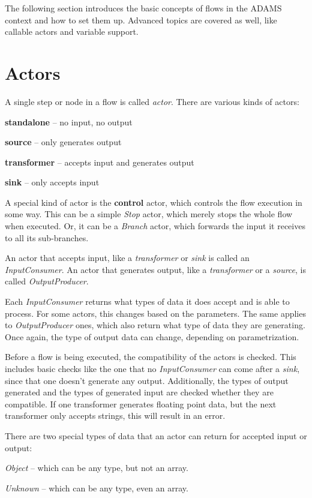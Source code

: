 The following section introduces the basic concepts of flows in the ADAMS
context and how to set them up. Advanced topics are covered as well, like
callable actors and variable support.

\section{Actors}
A single step or node in a flow is called \textit{actor}. There are various
kinds of actors:
\begin{tight_itemize}
  \item \textbf{standalone} -- no input, no output
  \item \textbf{source} -- only generates output
  \item \textbf{transformer} -- accepts input and generates output
  \item \textbf{sink} -- only accepts input
\end{tight_itemize}
A special kind of actor is the \textbf{control} actor, which controls the flow
execution in some way. This can be a simple \textit{Stop} actor, which merely
stops the whole flow when executed. Or, it can be a \textit{Branch} actor, which
forwards the input it receives to all its sub-branches.

An actor that accepts input, like a \textit{transformer} or \textit{sink} is
called an \textit{InputConsumer}. An actor that generates output, like
a \textit{transformer} or a \textit{source}, is called \textit{OutputProducer}.

Each \textit{InputConsumer} returns what types of data it does accept and is
able to process. For some actors, this changes based on the parameters. The same
applies to \textit{OutputProducer} ones, which also return what type of data
they are generating. Once again, the type of output data can change, depending
on parametrization.

Before a flow is being executed, the compatibility of the actors is
checked. This includes basic checks like the one that no \textit{InputConsumer}
can come after a \textit{sink}, since that one doesn't generate any output.
Additionally, the types of output generated and the types of generated input are
checked whether they are compatible. If one transformer generates floating
point data, but the next transformer only accepts strings, this will result in
an error.

There are two special types of data that an actor can return for accepted input
or output:
\begin{tight_itemize}
  \item \textit{Object} -- which can be any type, but not an array.
  \item \textit{Unknown} -- which can be any type, even an array.
\end{tight_itemize}

